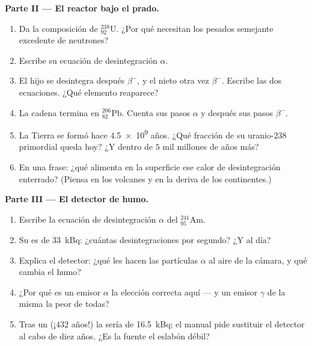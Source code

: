 \begin{problem}
\medskip
\noindent\textbf{Parte II --- El reactor bajo el prado.}
\begin{enumerate}[resume]
  \item Da la composición de ${}^{238}_{92}\mathrm{U}$. ¿Por qué
        necesitan los  pesados semejante excedente de neutrones?
  \item Escribe su ecuación de desintegración $\alpha$.
  \item El hijo se desintegra después $\beta^-$, y el nieto otra vez
        $\beta^-$. Escribe las dos ecuaciones. ¿Qué elemento reaparece?
  \item La cadena termina en ${}^{206}_{82}\mathrm{Pb}$. Cuenta sus
        pasos $\alpha$ y después sus pasos $\beta^-$.
  \item La Tierra se formó hace \num{4.5e9} años. ¿Qué fracción de su
        uranio-238 primordial queda hoy? ¿Y dentro de $5$ mil millones
        de años más?
  \item En una frase: ¿qué alimenta en la superficie ese calor de
        desintegración enterrado? (Piensa en los volcanes y en la deriva
        de los continentes.)
\end{enumerate}

\medskip
\noindent\textbf{Parte III --- El detector de humo.}
\begin{enumerate}[resume]
  \item Escribe la ecuación de desintegración $\alpha$ del
        ${}^{241}_{95}\mathrm{Am}$.
  \item Su  es de \qty{33}{kBq}: ¿cuántas desintegraciones por
        segundo? ¿Y al día?
  \item Explica el detector: ¿qué les hacen las partículas $\alpha$ al
        aire de la cámara, y qué cambia el humo?
  \item ¿Por qué es un emisor $\alpha$ la elección correcta aquí --- y
        un emisor $\gamma$ de la misma  la peor de todas?
  \item Tras un  (¡$432$ años!) la
         sería de \qty{16.5}{kBq}; el manual pide sustituir el
        detector al cabo de diez años. ¿Es la fuente el eslabón débil?
\end{enumerate}


\end{problem}
